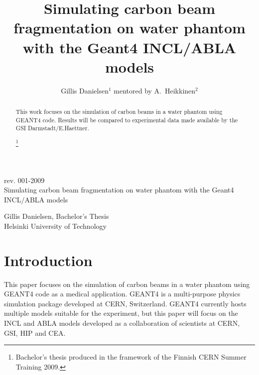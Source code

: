 \title{Simulating carbon beam fragmentation on water phantom with the Geant4 INCL/ABLA models}


\author{Gillis Danielsen$^1$ mentored by A.~Heikkinen$^2$} 
\begin{titlepage}
\pagestyle{empty}
\begin{center}
rev. 001-2009\\
\vspace{7.5 cm}
\Huge
Simulating carbon beam fragmentation on water phantom with the Geant4 INCL/ABLA models\\

\vspace{5cm}

\Large
Gillis Danielsen, Bachelor's Thesis\\
Helsinki University of Technology\\

    \vspace{0,2cm}
  \end{center}

\end{titlepage}


\begin{abstract}
This work focuses on the simulation of carbon beams in a water phantom using GEANT4 code. Results will be compared to experimental data made available by the GSI Darmstadt/E.Haettner.

\footnote{Bachelor's thesis produced in the framework of the Finnish CERN Summer Training 2009.}
\end{abstract}
\maketitle
\thispagestyle{fancy}

\tableofcontents

\section{Introduction}

This paper focuses on the simulation of carbon beams in a water phantom using GEANT4 code as a medical application. GEANT4 is a multi-purpose physics simulation package developed at CERN, Switzerland. GEANT4 currently hosts multiple models suitable for the experiment, but this paper will focus on the INCL and ABLA models developed as a collaboration of scientists at CERN, GSI, HIP and CEA.

